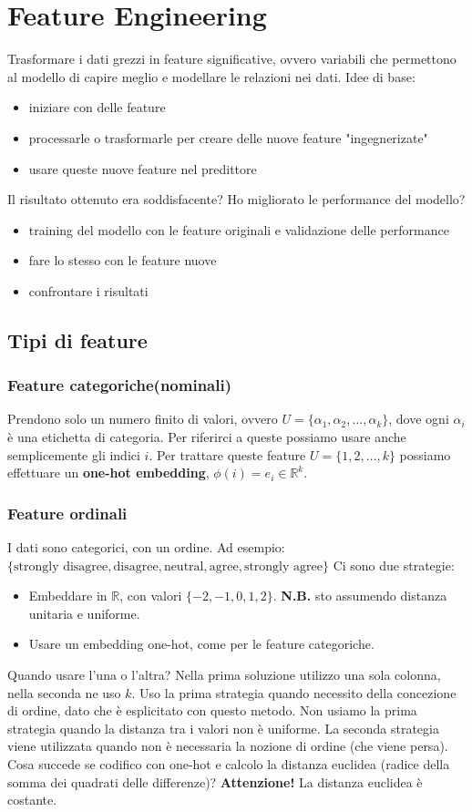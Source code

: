 
\chapter{Feature Engineering}
 Trasformare i dati grezzi in feature significative, ovvero variabili che permettono al modello di capire meglio e modellare le relazioni nei dati.
Idee di base:
\begin{itemize}
	\item iniziare con delle feature
	\item processarle o trasformarle per creare delle nuove feature "ingegnerizate"
	\item usare queste nuove feature nel predittore
\end{itemize}
Il risultato ottenuto era soddisfacente? Ho migliorato le performance del modello?
\begin{itemize}
	\item training del modello con le feature originali e validazione delle performance
	\item fare lo stesso con le feature nuove
	\item confrontare i risultati
\end{itemize}
\section{Tipi di feature}
\subsection{Feature categoriche(nominali)}
Prendono solo un numero finito di valori, ovvero $U=\{\alpha_1, \alpha_2, \ldots, \alpha_k\}$, dove ogni $\alpha_i$ è una etichetta di categoria.
Per riferirci a queste possiamo usare anche semplicemente gli indici $i$.
Per trattare queste feature $U=\{1, 2, \ldots, k\}$ possiamo effettuare un \textbf{one-hot embedding}, $\phi(i)=e_i\in \mathbb{R}^k$.
\subsection{Feature ordinali}
I dati sono categorici, con un ordine. 
Ad esempio: $\{\text{strongly disagree}, \text{disagree}, \text{neutral}, \text{agree}, \text{strongly agree}\}$
Ci sono due strategie:
\begin{itemize}
	\item Embeddare in $\mathbb{R}$, con valori $\{-2, -1, 0, 1, 2\}$. \textbf{N.B.} sto assumendo distanza unitaria e uniforme.
	\item Usare un embedding one-hot, come per le feature categoriche.
\end{itemize}
Quando usare l'una o l'altra?
Nella prima soluzione utilizzo una sola colonna, nella seconda ne uso $k$. Uso la prima strategia quando necessito della concezione di ordine, dato che è esplicitato con questo metodo.
Non usiamo la prima strategia quando la distanza tra i valori non è uniforme.
La seconda strategia viene utilizzata quando non è necessaria la nozione di ordine (che viene persa).
\\
Cosa succede se codifico con one-hot e calcolo la distanza euclidea (radice della somma dei quadrati delle differenze)? \textbf{Attenzione!} La distanza euclidea è costante.
